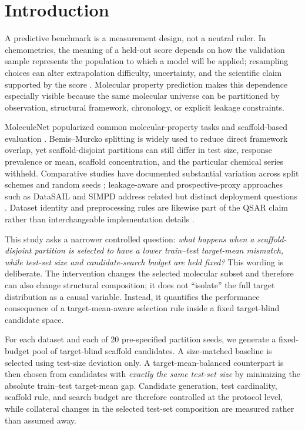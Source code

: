 \section{Introduction}

A predictive benchmark is a measurement design, not a neutral ruler. In chemometrics, the meaning of a held-out score depends on how the validation sample represents the population to which a model will be applied; resampling choices can alter extrapolation difficulty, uncertainty, and the scientific claim supported by the score \citep{esbensen2010proper,tropsha2003earnest,gramatica2007principles,lasfar2024robustness,kiraly2025leakage,camacho2026validation}. Molecular property prediction makes this dependence especially visible because the same molecular universe can be partitioned by observation, structural framework, chronology, or explicit leakage constraints.

MoleculeNet popularized common molecular-property tasks and scaffold-based evaluation \citep{wu2018moleculenet}. Bemis--Murcko splitting \citep{bemis1996properties} is widely used to reduce direct framework overlap, yet scaffold-disjoint partitions can still differ in test size, response prevalence or mean, scaffold concentration, and the particular chemical series withheld. Comparative studies have documented substantial variation across split schemes and random seeds \citep{yang2019learned,deng2023systematic,li2026partition}; leakage-aware and prospective-proxy approaches such as DataSAIL and SIMPD address related but distinct deployment questions \citep{joeres2025datasail,landrum2023simpd}. Dataset identity and preprocessing rules are likewise part of the QSAR claim rather than interchangeable implementation details \citep{nael2026dataset}.

This study asks a narrower controlled question: \emph{what happens when a scaffold-disjoint partition is selected to have a lower train--test target-mean mismatch, while test-set size and candidate-search budget are held fixed?} This wording is deliberate. The intervention changes the selected molecular subset and therefore can also change structural composition; it does not ``isolate'' the full target distribution as a causal variable. Instead, it quantifies the performance consequence of a target-mean-aware selection rule inside a fixed target-blind candidate space.

For each dataset and each of 20 pre-specified partition seeds, we generate a fixed-budget pool of target-blind scaffold candidates. A size-matched baseline is selected using test-size deviation only. A target-mean-balanced counterpart is then chosen from candidates with \emph{exactly the same test-set size} by minimizing the absolute train--test target-mean gap. Candidate generation, test cardinality, scaffold rule, and search budget are therefore controlled at the protocol level, while collateral changes in the selected test-set composition are measured rather than assumed away.

